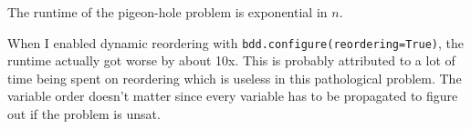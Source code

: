 \begin{enumerate}[label=(\alph*)]
      The runtime of the pigeon-hole problem is exponential in $n$.

      When I enabled dynamic reordering with \texttt{bdd.configure(reordering=True)}, the runtime actually got worse by about 10x. This is probably attributed to a lot of time being spent on reordering which is useless in this pathological problem. The variable order doesn't matter since every variable has to be propagated to figure out if the problem is unsat.
\end{enumerate}

